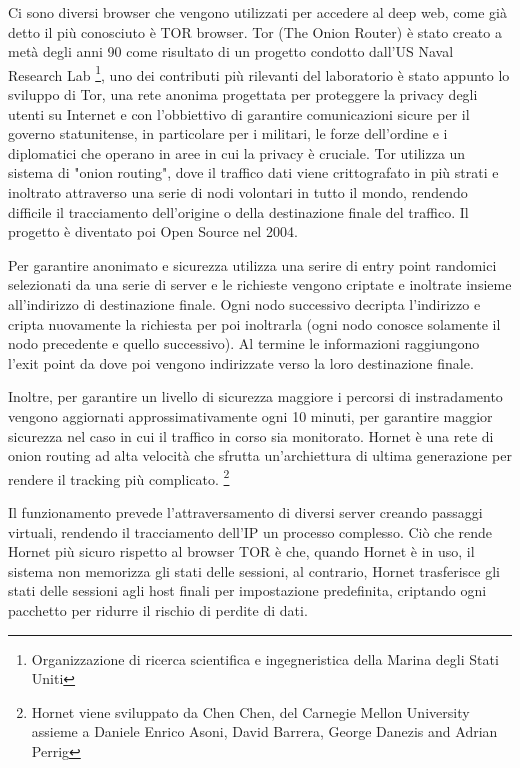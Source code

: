Ci sono diversi browser che vengono utilizzati per accedere al deep web, come già detto il più conosciuto è TOR browser. Tor (The Onion Router) è stato creato a metà degli anni 90 come risultato di un progetto condotto dall'US Naval Research Lab \footnote{Organizzazione di ricerca scientifica e ingegneristica della Marina degli Stati Uniti}, uno dei contributi più rilevanti del laboratorio è stato appunto lo sviluppo di Tor, una rete anonima progettata per proteggere la privacy degli utenti su Internet e con l'obbiettivo di garantire comunicazioni sicure per il governo statunitense, in particolare per i militari, le forze dell'ordine e i diplomatici che operano in aree in cui la privacy è cruciale.
Tor utilizza un sistema di "onion routing", dove il traffico dati viene crittografato in più strati e inoltrato attraverso una serie di nodi volontari in tutto il mondo, rendendo difficile il tracciamento dell'origine o della destinazione finale del traffico. Il progetto è diventato poi Open Source nel 2004.

Per garantire anonimato e sicurezza utilizza una serire di entry point randomici selezionati da una serie di server e le richieste vengono criptate e inoltrate insieme all'indirizzo di destinazione finale.
Ogni nodo successivo decripta l'indirizzo e cripta nuovamente la richiesta per poi inoltrarla (ogni nodo conosce solamente il nodo precedente e quello successivo). Al termine le informazioni raggiungono l'exit point da dove poi vengono indirizzate verso la loro destinazione finale.

\newpage

Inoltre, per garantire un livello di sicurezza maggiore i percorsi di instradamento vengono aggiornati approssimativamente ogni 10 minuti, per garantire maggior sicurezza nel caso in cui il traffico in corso sia monitorato.
Hornet è una rete di onion routing ad alta velocità che sfrutta un'archiettura di ultima generazione per rendere il tracking più complicato. \footnote{Hornet viene sviluppato da Chen Chen, del Carnegie Mellon University assieme a Daniele Enrico Asoni, David Barrera, George Danezis and Adrian Perrig}

Il funzionamento prevede l'attraversamento di diversi server creando passaggi virtuali, rendendo il tracciamento dell'IP un processo complesso. Ciò che rende Hornet più sicuro rispetto al browser TOR è che, quando Hornet è in uso, il sistema non memorizza gli stati delle sessioni, al contrario, Hornet trasferisce gli stati delle sessioni agli host finali per impostazione predefinita, criptando ogni pacchetto per ridurre il rischio di perdite di dati.

